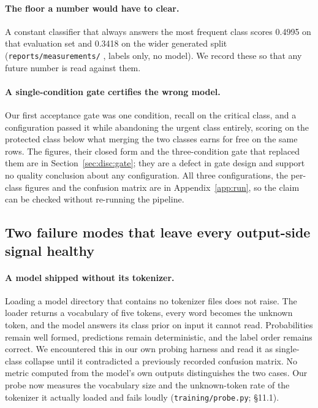 \paragraph{The floor a number would have to clear.} A constant classifier that
always answers the most frequent class scores 0.4995 on that evaluation set and
0.3418 on the wider generated split (\texttt{reports/measurements/}
, labels only, no model). We record these so that
any future number is read against them.

\paragraph{A single-condition gate certifies the wrong model.} Our first
acceptance gate was one condition, recall on the critical class, and a
configuration passed it while abandoning the urgent class entirely, scoring on
the protected class below what merging the two classes earns for free on the same
rows. The figures, their closed form and the three-condition gate that replaced
them are in Section~\ref{sec:disc:gate}; they are a defect in gate design and
support no quality conclusion about any configuration. All three configurations,
the per-class figures and the confusion matrix are in
Appendix~\ref{app:run}, so the claim can be checked without re-running the
pipeline.


\subsection{Two failure modes that leave every output-side signal healthy}
\label{sec:res:silent}

\paragraph{A model shipped without its tokenizer.} Loading a model directory that
contains no tokenizer files does not raise. The loader returns a vocabulary of
five tokens, every word becomes the unknown token, and the model answers its
class prior on input it cannot read. Probabilities remain well formed, predictions
remain deterministic, and the label order remains correct. We encountered this in
our own probing harness and read it as single-class collapse until it contradicted
a previously recorded confusion matrix. No metric computed from the model's own
outputs distinguishes the two cases. Our probe now measures the vocabulary size
and the unknown-token rate of the tokenizer it actually loaded and fails loudly
(\texttt{training/probe.py};  §11.1).

